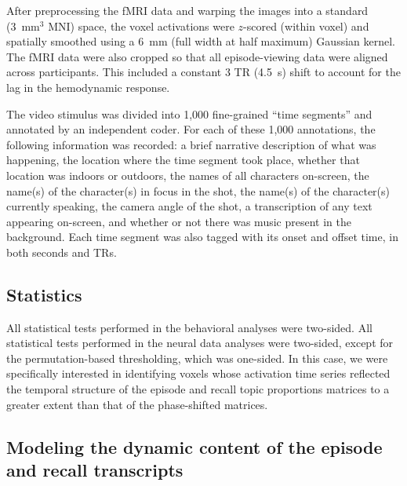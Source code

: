 \documentclass[10pt]{article}
\begin{document}
After preprocessing the fMRI data and warping the images into a standard (3~mm$^3$ MNI) space, the voxel activations were $z$-scored (within voxel) and spatially smoothed using a 6~mm (full width at half maximum) Gaussian kernel.  The fMRI data were also cropped so that all episode-viewing data were aligned across participants.  This included a constant 3 TR (4.5~s) shift to account for the lag in the hemodynamic response.  \citep[All of these preprocessing steps followed][where additional details may be found.]{ChenEtal17}

The video stimulus was divided into 1,000 fine-grained ``time segments'' and annotated by an independent coder.  For each of these 1,000 annotations, the following information was recorded: a brief narrative description of what was happening, the location where the time segment took place, whether that location was indoors or outdoors, the names of all characters on-screen, the name(s) of the character(s) in focus in the shot, the name(s) of the character(s) currently speaking, the camera angle of the shot, a transcription of any text appearing on-screen, and whether or not there was music present in the background.  Each time segment was also tagged with its onset and offset time, in both seconds and TRs.

\subsection*{Statistics}
All statistical tests performed in the behavioral analyses were two-sided.  All statistical tests performed in the neural data analyses were two-sided, except for the permutation-based thresholding, which was one-sided.  In this case, we were specifically interested in identifying voxels whose activation time series reflected the temporal structure of the episode and recall topic proportions matrices to a greater extent than that of the phase-shifted matrices.

\subsection*{Modeling the dynamic content of the episode and recall transcripts}
\end{document}

